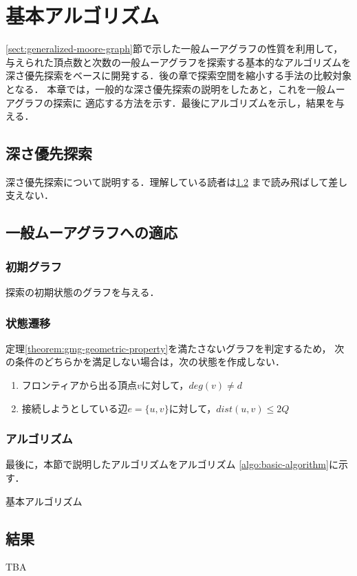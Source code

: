 
\chapter{基本アルゴリズム}
\label{chap:basic-algorithm}
\ref{sect:generalized-moore-graph}節で示した一般ムーアグラフの性質を利用して，
与えられた頂点数と次数の一般ムーアグラフを探索する基本的なアルゴリズムを
深さ優先探索をベースに開発する．後の章で探索空間を縮小する手法の比較対象となる．
本章では，一般的な深さ優先探索の説明をしたあと，これを一般ムーアグラフの探索に
適応する方法を示す．最後にアルゴリズムを示し，結果を与える．

\section{深さ優先探索}
\label{sect:depth-first-search}
深さ優先探索について説明する．理解している読者は\ref{sect:apply-to-gmg}
まで読み飛ばして差し支えない．

\section{一般ムーアグラフへの適応}
\label{sect:apply-to-gmg}

\subsection{初期グラフ}
\label{subsect:initial-graph}
探索の初期状態のグラフを与える．

\subsection{状態遷移}
\label{subsect:state-shifting}
定理\ref{theorem:gmg-geometric-property}を満たさないグラフを判定するため，
次の条件のどちらかを満足しない場合は，次の状態を作成しない．
\begin{enumerate}
\item フロンティアから出る頂点$v$に対して，$deg(v)\neq d$
\item 接続しようとしている辺$e=\{u,v\}$に対して，$dist(u,v)\leq 2Q$
\end{enumerate}

\subsection{アルゴリズム}
\label{subsect:basic-algorithm}
最後に，本節で説明したアルゴリズムをアルゴリズム
\ref{algo:basic-algorithm}に示す．
\begin{algorithm}
  \caption{基本アルゴリズム}
  \label{algo:basic-algorithm}
  \begin{algorithmic}
  \end{algorithmic}
\end{algorithm}

\section{結果}
\label{sect:basic-result}
TBA
